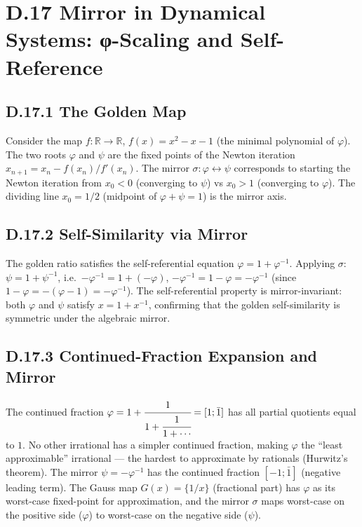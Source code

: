 \section*{D.17  Mirror in Dynamical Systems: φ-Scaling and Self-Reference}

\subsection*{D.17.1  The Golden Map}

Consider the map $f: \mathbb{R}\to\mathbb{R}$, $f(x) = x^2 - x - 1$ (the
minimal polynomial of $\varphi$).  The two roots $\varphi$ and $\psi$ are the
fixed points of the Newton iteration $x_{n+1} = x_n - f(x_n)/f'(x_n)$.
The mirror $\sigma: \varphi\leftrightarrow\psi$ corresponds to starting the Newton
iteration from $x_0 < 0$ (converging to $\psi$) vs $x_0 > 1$ (converging to $\varphi$).
The dividing line $x_0 = 1/2$ (midpoint of $\varphi+\psi = 1$) is the mirror axis.

\subsection*{D.17.2  Self-Similarity via Mirror}

The golden ratio satisfies the self-referential equation $\varphi = 1 + \varphi^{-1}$.
Applying $\sigma$: $\psi = 1 + \psi^{-1}$, i.e.\ $-\varphi^{-1} = 1 + (-\varphi)$,
$-\varphi^{-1} = 1 - \varphi = -\varphi^{-1}$ (since $1-\varphi = -(\varphi-1) = -\varphi^{-1}$). \checkmark
The self-referential property is mirror-invariant: both $\varphi$ and $\psi$
satisfy $x = 1 + x^{-1}$, confirming that the golden self-similarity is
symmetric under the algebraic mirror.

\subsection*{D.17.3  Continued-Fraction Expansion and Mirror}

The continued fraction $\varphi = 1+\cfrac{1}{1+\cfrac{1}{1+\cdots}} = [1;\bar1]$
has all partial quotients equal to $1$.  No other irrational has a simpler
continued fraction, making $\varphi$ the ``least approximable'' irrational — the
hardest to approximate by rationals (Hurwitz's theorem).
The mirror $\psi = -\varphi^{-1}$ has the continued fraction $[-1;\bar1]$ (negative
leading term).  The Gauss map $G(x) = \{1/x\}$ (fractional part) has $\varphi$
as its worst-case fixed-point for approximation, and the mirror $\sigma$ maps
worst-case on the positive side ($\varphi$) to worst-case on the negative side ($\psi$).

